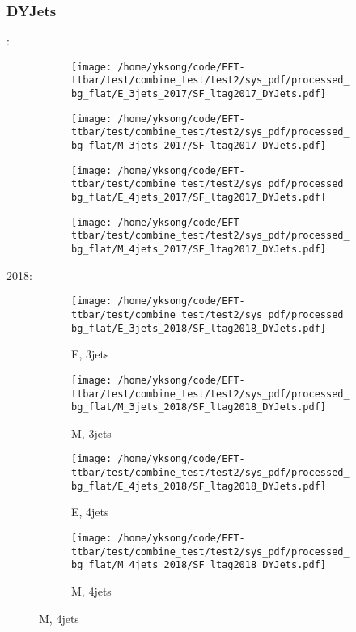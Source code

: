 \documentclass{beamer}
\begin{document}
\begin{frame}
\frametitle{DYJets}
\fontsize{5}{1}:
\begin{figure}
\centering
\begin{subfigure}[b]{0.24\textwidth}
\texttt{[image: /home/yksong/code/EFT-ttbar/test/combine\_test/test2/sys\_pdf/processed\_bg\_flat/E\_3jets\_2017/SF\_ltag2017\_DYJets.pdf]}
\end{subfigure}
\begin{subfigure}[b]{0.24\textwidth}
\texttt{[image: /home/yksong/code/EFT-ttbar/test/combine\_test/test2/sys\_pdf/processed\_bg\_flat/M\_3jets\_2017/SF\_ltag2017\_DYJets.pdf]}
\end{subfigure}
\begin{subfigure}[b]{0.24\textwidth}
\texttt{[image: /home/yksong/code/EFT-ttbar/test/combine\_test/test2/sys\_pdf/processed\_bg\_flat/E\_4jets\_2017/SF\_ltag2017\_DYJets.pdf]}
\end{subfigure}
\begin{subfigure}[b]{0.24\textwidth}
\texttt{[image: /home/yksong/code/EFT-ttbar/test/combine\_test/test2/sys\_pdf/processed\_bg\_flat/M\_4jets\_2017/SF\_ltag2017\_DYJets.pdf]}
\end{subfigure}
\end{figure}
2018:
\begin{figure}
\centering
\begin{subfigure}[b]{0.24\textwidth}
\texttt{[image: /home/yksong/code/EFT-ttbar/test/combine\_test/test2/sys\_pdf/processed\_bg\_flat/E\_3jets\_2018/SF\_ltag2018\_DYJets.pdf]}
\captionsetup{font=tiny}
\caption{E, 3jets}
\end{subfigure}
\begin{subfigure}[b]{0.24\textwidth}
\texttt{[image: /home/yksong/code/EFT-ttbar/test/combine\_test/test2/sys\_pdf/processed\_bg\_flat/M\_3jets\_2018/SF\_ltag2018\_DYJets.pdf]}
\captionsetup{font=tiny}
\caption{M, 3jets}
\end{subfigure}
\begin{subfigure}[b]{0.24\textwidth}
\texttt{[image: /home/yksong/code/EFT-ttbar/test/combine\_test/test2/sys\_pdf/processed\_bg\_flat/E\_4jets\_2018/SF\_ltag2018\_DYJets.pdf]}
\captionsetup{font=tiny}
\caption{E, 4jets}
\end{subfigure}
\begin{subfigure}[b]{0.24\textwidth}
\texttt{[image: /home/yksong/code/EFT-ttbar/test/combine\_test/test2/sys\_pdf/processed\_bg\_flat/M\_4jets\_2018/SF\_ltag2018\_DYJets.pdf]}
\captionsetup{font=tiny}
\caption{M, 4jets}
\end{subfigure}
\end{figure}
\end{frame}
\end{document}
